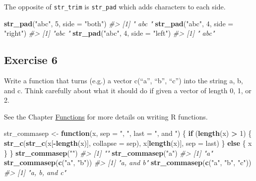 \documentclass[]{book}
\newenvironment{Shaded}{\begin{snugshade}}{\end{snugshade}}
\newcommand{\CommentTok}[1]{\textcolor[rgb]{0.56,0.35,0.01}{\textit{#1}}}
\newcommand{\ControlFlowTok}[1]{\textcolor[rgb]{0.13,0.29,0.53}{\textbf{#1}}}
\newcommand{\DataTypeTok}[1]{\textcolor[rgb]{0.13,0.29,0.53}{#1}}
\newcommand{\DecValTok}[1]{\textcolor[rgb]{0.00,0.00,0.81}{#1}}
\newcommand{\KeywordTok}[1]{\textcolor[rgb]{0.13,0.29,0.53}{\textbf{#1}}}
\newcommand{\NormalTok}[1]{#1}
\newcommand{\OperatorTok}[1]{\textcolor[rgb]{0.81,0.36,0.00}{\textbf{#1}}}
\newcommand{\StringTok}[1]{\textcolor[rgb]{0.31,0.60,0.02}{#1}}
\theoremstyle{plain}
\theoremstyle{remark}
\theoremstyle{definition}
\theoremstyle{definition}
\theoremstyle{definition}
\theoremstyle{remark}
\begin{document}
The opposite of \texttt{str\_trim} is \texttt{str\_pad} which adds
characters to each side.

\begin{Shaded}
\begin{Highlighting}[]
\KeywordTok{str_pad}\NormalTok{(}\StringTok{"abc"}\NormalTok{, }\DecValTok{5}\NormalTok{, }\DataTypeTok{side =} \StringTok{"both"}\NormalTok{)}
\CommentTok{#> [1] " abc "}
\KeywordTok{str_pad}\NormalTok{(}\StringTok{"abc"}\NormalTok{, }\DecValTok{4}\NormalTok{, }\DataTypeTok{side =} \StringTok{"right"}\NormalTok{)}
\CommentTok{#> [1] "abc "}
\KeywordTok{str_pad}\NormalTok{(}\StringTok{"abc"}\NormalTok{, }\DecValTok{4}\NormalTok{, }\DataTypeTok{side =} \StringTok{"left"}\NormalTok{)}
\CommentTok{#> [1] " abc"}
\end{Highlighting}
\end{Shaded}

\hypertarget{exercise-6-9}{%
\subsection{Exercise 6}\label{exercise-6-9}}

Write a function that turns (e.g.) a vector c(``a'', ``b'', ``c'') into
the string a, b, and c. Think carefully about what it should do if given
a vector of length 0, 1, or 2.

See the Chapter \protect\hyperlink{functions}{Functions} for more
details on writing R functions.

\begin{Shaded}
\begin{Highlighting}[]
\NormalTok{str_commasep <-}\StringTok{ }\ControlFlowTok{function}\NormalTok{(x, }\DataTypeTok{sep =} \StringTok{", "}\NormalTok{, }\DataTypeTok{last =} \StringTok{", and "}\NormalTok{) \{}
  \ControlFlowTok{if}\NormalTok{ (}\KeywordTok{length}\NormalTok{(x) }\OperatorTok{>}\StringTok{ }\DecValTok{1}\NormalTok{) \{}
    \KeywordTok{str_c}\NormalTok{(}\KeywordTok{str_c}\NormalTok{(x[}\OperatorTok{-}\KeywordTok{length}\NormalTok{(x)], }\DataTypeTok{collapse =}\NormalTok{ sep),}
\NormalTok{                x[}\KeywordTok{length}\NormalTok{(x)],}
                \DataTypeTok{sep =}\NormalTok{ last)}
\NormalTok{  \} }\ControlFlowTok{else}\NormalTok{ \{}
\NormalTok{    x}
\NormalTok{  \}}
\NormalTok{\}}
\KeywordTok{str_commasep}\NormalTok{(}\StringTok{""}\NormalTok{)}
\CommentTok{#> [1] ""}
\KeywordTok{str_commasep}\NormalTok{(}\StringTok{"a"}\NormalTok{)}
\CommentTok{#> [1] "a"}
\KeywordTok{str_commasep}\NormalTok{(}\KeywordTok{c}\NormalTok{(}\StringTok{"a"}\NormalTok{, }\StringTok{"b"}\NormalTok{))}
\CommentTok{#> [1] "a, and b"}
\KeywordTok{str_commasep}\NormalTok{(}\KeywordTok{c}\NormalTok{(}\StringTok{"a"}\NormalTok{, }\StringTok{"b"}\NormalTok{, }\StringTok{"c"}\NormalTok{))}
\CommentTok{#> [1] "a, b, and c"}
\end{Highlighting}
\end{Shaded}
\end{document}
